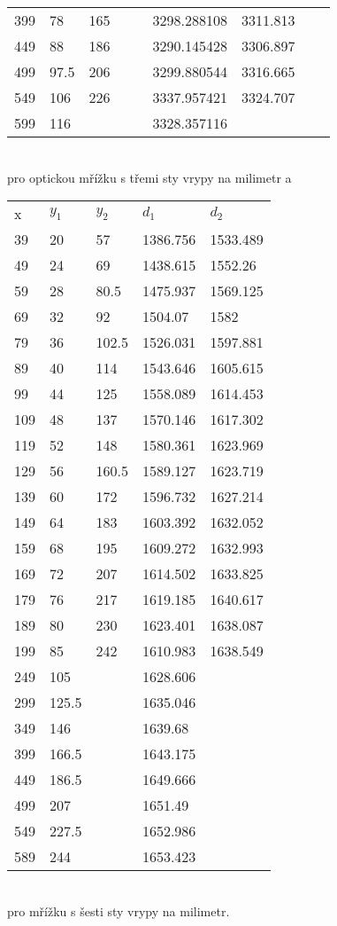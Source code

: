 \documentclass[czech,11pt,a4paper]{article}
\begin{document}
\begin{center}
\begin{tabular}{l|llll|llll}
			399 & 78   & 165   &       &       & 3298.288108 & 3311.813 &          &          \\
			449 & 88   & 186   &       &       & 3290.145428 & 3306.897 &          &          \\
			499 & 97.5 & 206   &       &       & 3299.880544 & 3316.665 &          &          \\
			549 & 106  & 226   &       &       & 3337.957421 & 3324.707 &          &          \\
			599 & 116  &       &       &       & 3328.357116 &          &          &        
		\end{tabular}\\
		pro optickou mřížku s třemi sty vrypy na milimetr a \\
		\begin{tabular}{l|ll|ll}
			x   & $y_1$    & $y_2$    & $d_1$       & $d_2$       \\
			39  & 20    & 57    & 1386.756 & 1533.489 \\
			49  & 24    & 69    & 1438.615 & 1552.26  \\
			59  & 28    & 80.5  & 1475.937 & 1569.125 \\
			69  & 32    & 92    & 1504.07  & 1582     \\
			79  & 36    & 102.5 & 1526.031 & 1597.881 \\
			89  & 40    & 114   & 1543.646 & 1605.615 \\
			99  & 44    & 125   & 1558.089 & 1614.453 \\
			109 & 48    & 137   & 1570.146 & 1617.302 \\
			119 & 52    & 148   & 1580.361 & 1623.969 \\
			129 & 56    & 160.5 & 1589.127 & 1623.719 \\
			139 & 60    & 172   & 1596.732 & 1627.214 \\
			149 & 64    & 183   & 1603.392 & 1632.052 \\
			159 & 68    & 195   & 1609.272 & 1632.993 \\
			169 & 72    & 207   & 1614.502 & 1633.825 \\
			179 & 76    & 217   & 1619.185 & 1640.617 \\
			189 & 80    & 230   & 1623.401 & 1638.087 \\
			199 & 85    & 242   & 1610.983 & 1638.549 \\
			249 & 105   &       & 1628.606 &          \\
			299 & 125.5 &       & 1635.046 &          \\
			349 & 146   &       & 1639.68  &          \\
			399 & 166.5 &       & 1643.175 &          \\
			449 & 186.5 &       & 1649.666 &          \\
			499 & 207   &       & 1651.49  &          \\
			549 & 227.5 &       & 1652.986 &          \\
			589 & 244   &       & 1653.423 &         
		\end{tabular}\\
		pro mřížku s šesti sty vrypy na milimetr.
		\end{center}
\end{document}
